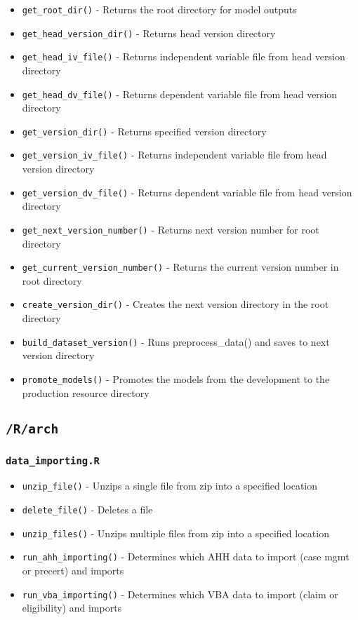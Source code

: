 \documentclass[
]{book}
\providecommand{\tightlist}{%
  \setlength{\itemsep}{0pt}\setlength{\parskip}{0pt}}
\begin{document}
\begin{itemize}
\tightlist
\item
  \texttt{get\_root\_dir()} - Returns the root directory for model outputs
\item
  \texttt{get\_head\_version\_dir()} - Returns head version directory
\item
  \texttt{get\_head\_iv\_file()} - Returns independent variable file from head version directory
\item
  \texttt{get\_head\_dv\_file()} - Returns dependent variable file from head version directory
\item
  \texttt{get\_version\_dir()} - Returns specified version directory
\item
  \texttt{get\_version\_iv\_file()} - Returns independent variable file from head version directory
\item
  \texttt{get\_version\_dv\_file()} - Returns dependent variable file from head version directory
\item
  \texttt{get\_next\_version\_number()} - Returns next version number for root directory
\item
  \texttt{get\_current\_version\_number()} - Returns the current version number in root directory
\item
  \texttt{create\_version\_dir()} - Creates the next version directory in the root directory
\item
  \texttt{build\_dataset\_version()} - Runs preprocess\_data() and saves to next version directory
\item
  \texttt{promote\_models()} - Promotes the models from the development to the production resource directory
\end{itemize}

\hypertarget{rarch}{%
\subsection{\texorpdfstring{\texttt{/R/arch}}{/R/arch}}\label{rarch}}

\hypertarget{data_importing.r}{%
\subsubsection{\texorpdfstring{\texttt{data\_importing.R}}{data\_importing.R}}\label{data_importing.r}}

\begin{itemize}
\tightlist
\item
  \texttt{unzip\_file()} - Unzips a single file from zip into a specified location
\item
  \texttt{delete\_file()} - Deletes a file
\item
  \texttt{unzip\_files()} - Unzips multiple files from zip into a specified location
\item
  \texttt{run\_ahh\_importing()} - Determines which AHH data to import (case mgmt or precert) and imports
\item
  \texttt{run\_vba\_importing()} - Determines which VBA data to import (claim or eligibility) and imports
\end{itemize}
\end{document}
